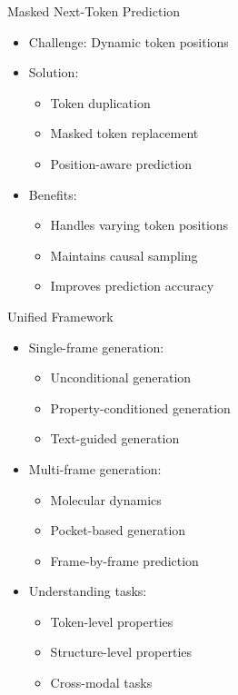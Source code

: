 \begin{frame}{Masked Next-Token Prediction}
    \begin{itemize}
        \item Challenge: Dynamic token positions
        \item Solution:
        \begin{itemize}
            \item Token duplication
            \item Masked token replacement
            \item Position-aware prediction
        \end{itemize}
        \item Benefits:
        \begin{itemize}
            \item Handles varying token positions
            \item Maintains causal sampling
            \item Improves prediction accuracy
        \end{itemize}
    \end{itemize}
\end{frame}

\begin{frame}{Unified Framework}
    \begin{itemize}
        \item Single-frame generation:
        \begin{itemize}
            \item Unconditional generation
            \item Property-conditioned generation
            \item Text-guided generation
        \end{itemize}
        \item Multi-frame generation:
        \begin{itemize}
            \item Molecular dynamics
            \item Pocket-based generation
            \item Frame-by-frame prediction
        \end{itemize}
        \item Understanding tasks:
        \begin{itemize}
            \item Token-level properties
            \item Structure-level properties
            \item Cross-modal tasks
        \end{itemize}
    \end{itemize}
\end{frame}

